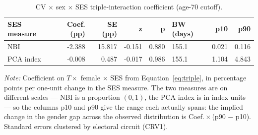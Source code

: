 \begin{table}
\caption{CV $\times$ sex $\times$ SES triple-interaction coefficient (age-70 cutoff).}
\label{tab:triple_T70}
\begin{tabular}{lrrrrlrr}
\toprule
SES measure & Coef. (pp) & SE (pp) & z & p & BW (days) & p10 & p90 \\
\midrule
NBI & -2.388 & 15.817 & -0.151 & 0.880 & 155.1 & 0.021 & 0.116 \\
PCA index & -0.008 & 0.487 & -0.017 & 0.986 & 155.1 & 1.104 & 4.843 \\
\bottomrule
\end{tabular}
\par\vspace{0.6em}
{\footnotesize\begin{minipage}{\linewidth}\emph{Note:} Coefficient on $T \times$ female $\times$ SES from Equation~\ref{eq:triple}, in percentage points per one-unit change in the SES measure. The two measures are on different scales --- NBI is a proportion $(0,1)$, the PCA index is in index units --- so the columns p10 and p90 give the range each actually spans: the implied change in the gender gap across the observed distribution is Coef.\,$\times$\,(p90 $-$ p10). Standard errors clustered by electoral circuit (CRV1).\end{minipage}}
\end{table}
